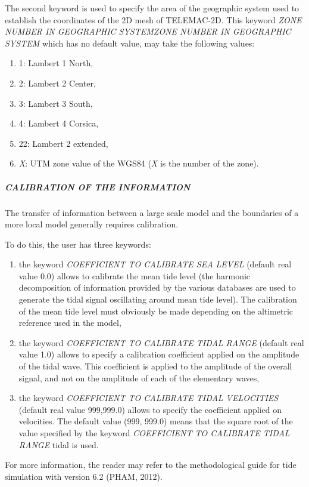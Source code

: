  The second keyword is used to specify the area of the geographic system used to establish the coordinates of the 2D mesh of TELEMAC-2D. This keyword \textit{ZONE NUMBER IN GEOGRAPHIC SYSTEMZONE NUMBER IN GEOGRAPHIC SYSTEM} which has no default value, may take the following values:

\begin{enumerate}
\item  1: Lambert 1 North,

\item  2: Lambert 2 Center,

\item  3: Lambert 3 South,

\item  4: Lambert 4 Corsica,

\item  22: Lambert 2 extended,

\item  \textit{X}: UTM zone value of the WGS84 (\textit{X} is the number of the zone).
\end{enumerate}


\subparagraph{ CALIBRATION OF THE INFORMATION}

 The transfer of information between a large scale model and the boundaries of a more local model generally requires calibration.

 To do this, the user has three keywords:

\begin{enumerate}
\item  the keyword \textit{COEFFICIENT TO CALIBRATE SEA LEVEL} (default real value 0.0) allows to calibrate the mean tide level (the harmonic decomposition of information provided by the various databases are used to generate the tidal signal oscillating around mean tide level). The calibration of the mean tide level must obviously be made depending on the altimetric reference used in the model,

\item  the keyword \textit{COEFFICIENT TO CALIBRATE TIDAL RANGE} (default real value 1.0) allows to specify a calibration coefficient applied on the amplitude of the tidal wave. This coefficient is applied to the amplitude of the overall signal, and not on the amplitude of each of the elementary waves,

\item  the keyword \textit{COEFFICIENT TO CALIBRATE TIDAL VELOCITIES} (default real value 999,999.0) allows to specify the coefficient applied on velocities. The default value (999, 999.0) means that the square root of the value specified by the keyword \textit{COEFFICIENT TO CALIBRATE TIDAL RANGE} tidal is used.
\end{enumerate}

 For more information, the reader may refer to the methodological guide for tide simulation with version 6.2 (PHAM, 2012).


